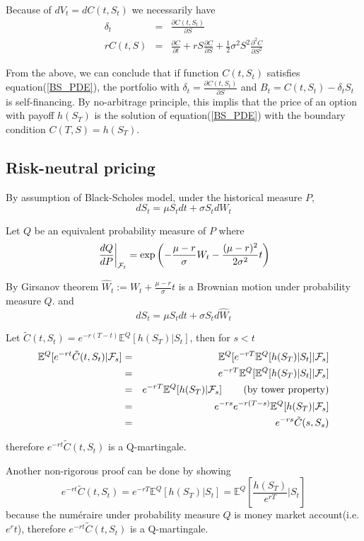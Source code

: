 \documentclass[10pt]{article}
\theoremstyle{plain}
\numberwithin{equation}{section}
\numberwithin{table}{section}
\newcommand{\s}{\sigma}
\newcommand{\prt}[1]{\left( #1 \right)}  %
\newcommand{\de}{\delta}
\newcommand{\pa}{\partial}
\newcommand{\E}{\mathbb{E}}
\begin{document}
Because of $dV_t=dC(t,S_t)$ we necessarily have 
\begin{eqnarray}
    \de_t &=& \frac{\pa C(t,S_t)}{\pa S} \nonumber \\
    rC(t,S) &=& \frac{\pa C}{\pa t} +rS\frac{\pa C}{\pa S} + \frac{1}{2} \s^2 S^2 \frac{\pa^2 C}{\pa S^2} \label{BS_PDE}
\end{eqnarray}


From the above, we can conclude that if function $C(t,S_t)$ satisfies equation(\ref{BS_PDE}), the portfolio with $\de_t=\frac{\pa C(t,S_t)}{\pa S}$ and $B_t=C(t,S_t)-\de_t S_t$ is self-financing.
By no-arbitrage principle, this implis that the price of an option with payoff $h(S_T)$ is the solution of equation(\ref{BS_PDE}) with the boundary condition $C(T,S)=h(S_T)$.


\subsection{Risk-neutral pricing}

By assumption of Black-Scholes model, under the historical measure $P$, 
\[
    d S_t = \mu S_t dt+\s S_t d W_t    
\]

Let $Q$ be an equivalent probability measure of $P$ where 
\[
    \left.\frac{dQ}{dP}\right|_{{\cal F}_t} = 
    \exp\prt{-\frac{\mu - r}{\s} W_t - \frac{(\mu-r)^2}{2\s^2}t}
\]

By Girsanov theorem $\widehat{W}_t := W_t + \frac{\mu - r}{\s} t$ is a Brownian motion under probability measure $Q$.
and 
\[
    d S_t = \mu S_t dt+\s S_t d \widehat{W}_t    
\]

Let $\tilde{C}(t, S_t)=e^{-r(T-t)} \E^Q [h(S_T) \vert S_t ] $, then for $s<t$
\begin{eqnarray*}
    \E^Q [e^{-rt} \tilde{C}(t,S_t) \vert {\cal{F}}_s ] &=&  \E^Q [e^{-rT}  \E^Q [h(S_T) \vert S_t ] \vert {\cal{F}}_s ]  \\
    &=& e^{-rT} \E^Q [\E^Q [h(S_T) \vert S_t ] \vert {\cal{F}}_s ] \\
    &=& e^{-rT} \E^Q [h(S_T) \vert {\cal{F}}_s ]  \qquad  \prt{\textrm{by tower property}}\\
    &=& e^{-rs} e^{-r(T-s)}\E^Q [h(S_T) \vert {\cal{F}}_s ] \\
    &=& e^{-rs}\tilde C(s,S_s)
\end{eqnarray*}

therefore $e^{-rt} \tilde{C}(t,S_t)$ is a Q-martingale.

Another non-rigorous proof can be done by showing
\[
    e^{-rt} \tilde{C}(t,S_t) = e^{-rT}  \E^Q [h(S_T) \vert S_t ]  = \E^Q [\frac{h(S_T)}{e^{rT}} \vert S_t ]
\]
because the num\'eraire under probability measure $Q$ is money market account(i.e. $e^rt$), therefore $e^{-rt} \tilde{C}(t,S_t)$ is a Q-martingale.
\end{document}
